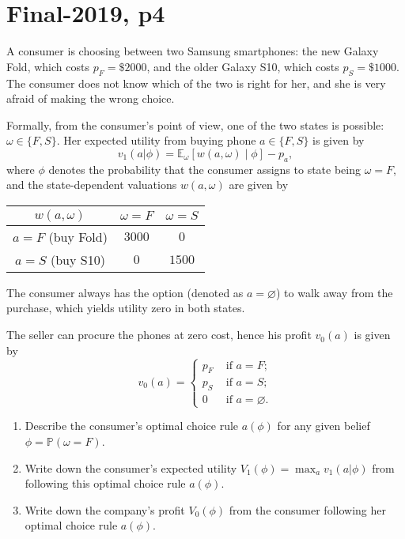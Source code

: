 \documentclass[a4paper]{article}
\begin{document}
\fi




\section{Final-2019, p4}
	
	A consumer is choosing between two Samsung smartphones: the new Galaxy Fold, which costs $p_F = \$ 2000$, and the older Galaxy S10, which costs $p_S = \$1000$. The consumer does not know which of the two is right for her, and she is very afraid of making the wrong choice. 
	
	Formally, from the consumer's point of view, one of the two states is possible: $\omega \in \{F,S\}$. Her expected utility from buying phone $a \in \{F,S\}$ is given by
	\begin{equation*}
		v_1(a|\phi) = \mathbb{E}_\omega \left[ w(a,\omega) \mid \phi \right] - p_a,
	\end{equation*}
	where $\phi$ denotes the probability that the consumer assigns to state being $\omega = F$, and the state-dependent valuations $w(a,\omega)$ are given by
	\begin{center}
		\begin{tabular}{c | c | c |}
			$w(a,\omega)$ 		& $\omega = F$ 	& $\omega = S$ \\ \hline
			$a=F$ (buy Fold)	& $3000$ 	& $0$	\\ \hline
			$a=S$ (buy S10)		& $0$ 	& $1500$	\\ \hline
		\end{tabular}
	\end{center}
	The consumer always has the option (denoted as $a = \varnothing$) to walk away from the purchase, which yields utility zero in both states.
	
	The seller can procure the phones at zero cost, hence his profit $v_0(a)$ is given by
	\begin{equation*}
		v_0(a) = 
		\begin{cases}
			p_F & \text{ if } a=F; \\
			p_S & \text{ if } a=S; \\
			0 & \text{ if } a=\varnothing.
		\end{cases}
	\end{equation*}
	
	\begin{enumerate}
		\item %
		Describe the consumer's optimal choice rule $a(\phi)$ for any given belief $\phi = \mathbb{P}(\omega=F)$.
		\item %
		Write down the consumer's expected utility $V_1(\phi) = \max_a v_1(a|\phi)$ from following this optimal choice rule $a(\phi)$. 
		\item %
		Write down the company's profit $V_0(\phi)$ from the consumer following her optimal choice rule $a(\phi)$.
	\end{enumerate}
	
\end{document}
